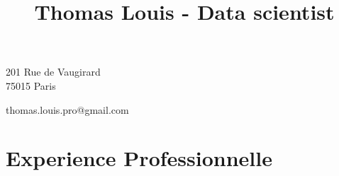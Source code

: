 \documentclass[6pt]{article}
\title{\bfseries\Huge Thomas Louis - Data scientist\vspace{-3ex}}
\date{}
\begin{document}
\begingroup
\let\center\flushleft
\let\endcenter\endflushleft
\maketitle
\endgroup
\begin{minipage}[ht]{0.48\textwidth}
201 Rue de Vaugirard\\
75015 Paris
\end{minipage}
\vspace{-0.5em}
\begin{minipage}[ht]{0.48\textwidth}
thomas.louis.pro@gmail.com
\end{minipage}
\vspace{-0.5em}
\section*{Experience Professionnelle}
\end{document}

